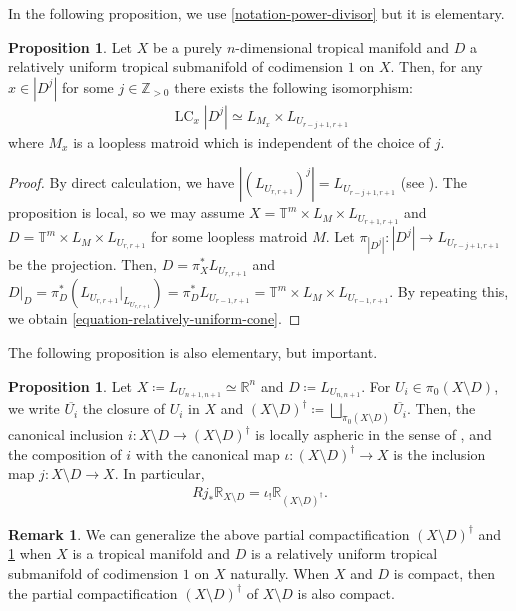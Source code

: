 \documentclass[a4paper,dvipdfmx,reqno,12pt]{amsart}
\theoremstyle{definition}
\newtheorem{proposition}[theorem]{Proposition}
\newtheorem{remark}[theorem]{Remark}
\newcommand{\deq}{\coloneqq}
\newcommand{\opn}[1]{\operatorname{#1}}
\numberwithin{equation}{section}
\begin{document}
In the following proposition, we use
\cref{notation-power-divisor} but it is elementary.
\begin{proposition}
Let $X$ be a purely $n$-dimensional tropical manifold
and $D$ a relatively uniform tropical submanifold of
codimension $1$ on $X$.
Then, for any $x\in |D^{j}|$ for some $j\in \mathbb{Z}_{>0}$
there exists the following isomorphism:
\begin{align}
\label{equation-relatively-uniform-cone}
\opn{LC}_x |D^{j}|\simeq 
L_{M_{x}}
\times L_{U_{r-j+1,r+1}}
\end{align}
where $M_x$ is a loopless matroid which is independent of
the choice of $j$.
\end{proposition}
\begin{proof}
By direct calculation, we have 
$|(L_{U_{r,r+1}})^{j}|=L_{U_{r-j+1,r+1}}$
(see \cite[Example 3.9]{MR2591823}).
The proposition is local, so we may assume 
$X=\mathbb{T}^{m}\times L_{M}\times L_{U_{r+1,r+1}}$ and 
$D=\mathbb{T}^{m}\times 
L_{M}\times L_{U_{r,r+1}}$
for some loopless matroid $M$.
Let $\pi_{|D^j|} \colon |D^{j}|\to L_{U_{r-j+1,r+1}}$
be the projection.
Then, $D=\pi_{X}^*L_{U_{r,r+1}}$ and 
$D|_D=\pi_D^{*}(L_{U_{r,r+1}}|_{L_{U_{r,r+1}}})
=\pi_D^{*}L_{U_{r-1,r+1}}=
\mathbb{T}^{m}\times L_{M}\times L_{U_{r-1,r+1}}$.
By repeating this, we obtain
\eqref{equation-relatively-uniform-cone}.
\end{proof}

The following proposition is also elementary,
but important.

\begin{proposition}
\label{proposition-cpt-complement}
Let $X\deq L_{U_{n+1,n+1}}\simeq \mathbb{R}^n$ and
$D\deq L_{U_{n,n+1}}$. 
For $U_i\in \pi_0(X\setminus D)$, we write 
$\overline{U_i}$ the closure of $U_i$ in $X$
and $(X\setminus D)^{\dagger}\deq \bigsqcup_{\pi_0(X\setminus D)}
\overline{U_i}$.
Then, the canonical inclusion
$i\colon X\setminus D\to
(X\setminus D)^{\dagger}$ is
locally aspheric in the sense of
\cite[Chapter V. Corollary 1.3.2]{MR3838359}, and
the composition of $i$ with
the canonical map $\iota\colon
(X\setminus D)^{\dagger}\to X$ is the inclusion 
map $j\colon X\setminus D\to X$. 
In particular,
\begin{align}
Rj_*\mathbb{R}_{X\setminus D}=\iota_!
\mathbb{R}_{(X\setminus D)^{\dagger}}.
\end{align}

\end{proposition}

\begin{remark}
We can generalize 
the above partial compactification
$(X\setminus D)^{\dagger}$ and 
\cref{proposition-cpt-complement} when
$X$ is a tropical manifold and $D$ is a
relatively uniform tropical submanifold of codimension
$1$ on $X$ naturally.
When $X$ and $D$ is compact, then the partial compactification
$(X\setminus D)^{\dagger}$ of $X\setminus D$
is also compact. 
\end{remark}
\end{document}
